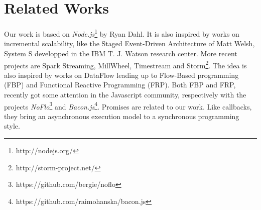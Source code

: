 \section{Related Works} \label{section:related}

Our work is based on \textit{Node.js}\footnote{\raggedright http://nodejs.org/} by Ryan Dahl.
It is also inspired by works on incremental scalability, like the Staged Event-Driven Architecture of Matt Welsh\cite{Welsh2000}, System S developped in the IBM T. J. Watson research center\cite{Jain2006}.
More recent projects are Spark Streaming\cite{Zaharia2012}, MillWheel\cite{Akidau2013}, Timestream\cite{Qian2013} and Storm\footnote{\raggedright http://storm-project.net/}.
The idea is also inspired by works on DataFlow leading up to Flow-Based programming (FBP) and Functional Reactive Programming (FRP)\cite{Elliott1997}.
Both FBP and FRP, recently got some attention in the Javascript community, respectively with the projects \textit{NoFlo}\footnote{\raggedright https://github.com/bergie/noflo} and \textit{Bacon.js}\footnote{\raggedright https://github.com/raimohanska/bacon.js}.
Promises\cite{Liskov1988} are related to our work.
Like callbacks, they bring an asynchronous execution model to a synchronous programming style.